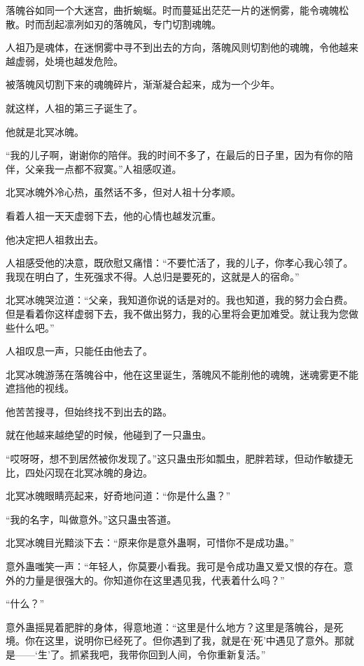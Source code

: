 \begin{this_body}
落魄谷如同一个大迷宫，曲折蜿蜒。时而蔓延出茫茫一片的迷惘雾，能令魂魄松散。时而刮起凛冽如刃的落魄风，专门切割魂魄。

人祖乃是魂体，在迷惘雾中寻不到出去的方向，落魄风则切割他的魂魄，令他越来越虚弱，处境也越发危险。

被落魄风切割下来的魂魄碎片，渐渐凝合起来，成为一个少年。

就这样，人祖的第三子诞生了。

他就是北冥冰魄。

“我的儿子啊，谢谢你的陪伴。我的时间不多了，在最后的日子里，因为有你的陪伴，父亲我一点都不寂寞。”人祖感叹道。

北冥冰魄外冷心热，虽然话不多，但对人祖十分孝顺。

看着人祖一天天虚弱下去，他的心情也越发沉重。

他决定把人祖救出去。

人祖感受他的决意，既欣慰又痛惜：“不要忙活了，我的儿子，你孝心我心领了。我现在明白了，生死强求不得。人总归是要死的，这就是人的宿命。”

北冥冰魄哭泣道：“父亲，我知道你说的话是对的。我也知道，我的努力会白费。但是看着你这样虚弱下去，我不做出努力，我的心里将会更加难受。就让我为您做些什么吧。”

人祖叹息一声，只能任由他去了。

北冥冰魄游荡在落魄谷中，他在这里诞生，落魄风不能削他的魂魄，迷魂雾更不能遮挡他的视线。

他苦苦搜寻，但始终找不到出去的路。

就在他越来越绝望的时候，他碰到了一只蛊虫。

“哎呀呀，想不到居然被你发现了。”这只蛊虫形如瓢虫，肥胖若球，但动作敏捷无比，四处闪现在北冥冰魄的身边。

北冥冰魄眼睛亮起来，好奇地问道：“你是什么蛊？”

“我的名字，叫做意外。”这只蛊虫答道。

北冥冰魄目光黯淡下去：“原来你是意外蛊啊，可惜你不是成功蛊。”

意外蛊嗤笑一声：“年轻人，你莫要小看我。我可是令成功蛊又爱又恨的存在。意外的力量是很强大的。你知道你在这里遇见我，代表着什么吗？”

“什么？”

意外蛊摇晃着肥胖的身体，得意地道：“这里是什么地方？这里是落魄谷，是死境。你在这里，说明你已经死了。但你遇到了我，就是在‘死’中遇见了意外。那就是——‘生’了。抓紧我吧，我带你回到人间，令你重新复活。”


\end{this_body}
